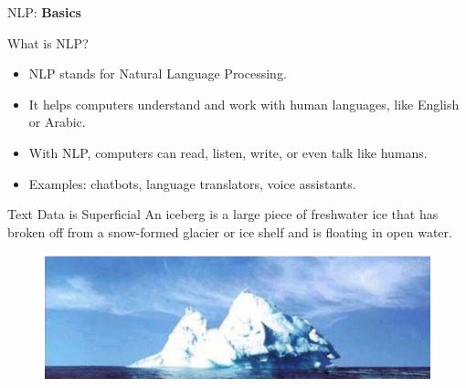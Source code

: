 \begin{frame}{}
    \LARGE NLP: \textbf{Basics}
\end{frame}

\begin{frame}{What is NLP?}
    \begin{itemize}
        \item NLP stands for Natural Language Processing.
        \item It helps computers understand and work with human languages, like English or Arabic.
        \item With NLP, computers can read, listen, write, or even talk like humans.
        \item Examples: chatbots, language translators, voice assistants.
    \end{itemize}
\end{frame}

\begin{frame}[allowframebreaks]{Text Data is Superficial}
An iceberg is a large piece of freshwater ice that has broken off
from a snow-formed glacier or ice shelf and is floating in open
water.
\begin{figure}
    \centering
    \includegraphics[height=0.9\textheight, width=\textwidth, keepaspectratio]{images/nlp/intro_slide_4_1_img.png}
\end{figure}

\end{frame}

